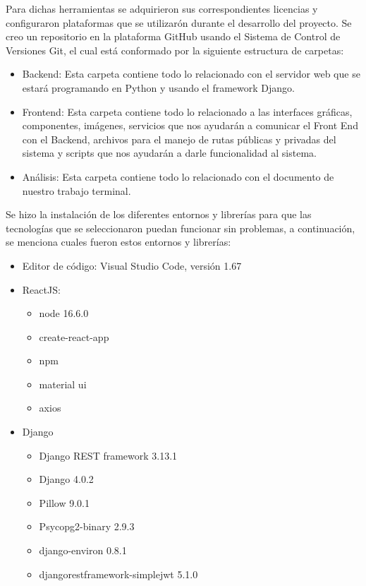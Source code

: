 Para dichas herramientas se adquirieron sus correspondientes licencias y configuraron plataformas que se utilizarón durante el desarrollo del proyecto.
Se creo un repositorio en la plataforma GitHub usando el Sistema de Control de Versiones Git, el cual está conformado por la siguiente estructura de carpetas:
    \begin{itemize}
        \item Backend: Esta carpeta contiene todo lo relacionado con el servidor web que se estará programando en Python y usando el framework Django.
        \item Frontend: Esta carpeta contiene todo lo relacionado a las interfaces gráficas, componentes, imágenes, servicios que nos ayudarán a comunicar el Front End con el Backend, archivos para el manejo de rutas públicas y privadas del sistema y scripts que nos ayudarán a darle funcionalidad al sistema.
        \item Análisis:  Esta carpeta contiene todo lo relacionado con el documento de nuestro trabajo terminal.
    \end{itemize}

    Se hizo la instalación de los diferentes entornos y librerías para que las tecnologías que se seleccionaron puedan funcionar sin problemas, a continuación, se menciona cuales fueron estos entornos y librerías:
    \begin{itemize}
        \item Editor de código:  Visual Studio Code, versión 1.67
        \item ReactJS:
        \begin{itemize}
            \item node 16.6.0
            \item create-react-app
            \item npm
            \item material ui
            \item axios
        \end{itemize}
        \item Django
        \begin{itemize}
            \item Django REST framework 3.13.1
            \item Django 4.0.2
            \item Pillow 9.0.1
            \item Psycopg2-binary 2.9.3
            \item django-environ 0.8.1
            \item djangorestframework-simplejwt 5.1.0
        \end{itemize}
    \end{itemize}

